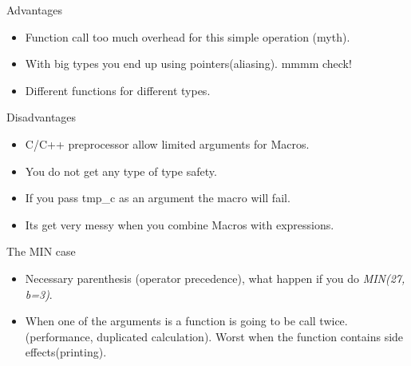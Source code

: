 \begin{frame}{Advantages}
    \begin{itemize}\addtolength{\itemsep}{1\baselineskip}
        \item Function call too much overhead for this simple operation (myth).

        \item With big types you end up using pointers(aliasing).
            {\color{red}mmmm check!}

        \item Different functions for different types.
    \end{itemize}
\end{frame}

\begin{frame}{Disadvantages}
    \begin{itemize}\addtolength{\itemsep}{1\baselineskip}
        \item C/C++ preprocessor allow limited arguments for Macros.

        \item You do not get any type of type safety.

        \item If you pass tmp\_c as an argument the macro will fail.

        \item Its get very messy when you combine Macros with expressions.
    \end{itemize}
\end{frame}


\begin{frame}{The MIN case}
    \begin{itemize}\addtolength{\itemsep}{2\baselineskip}
        \item Necessary parenthesis (operator precedence), what happen if you 
            do \emph{MIN(27, b=3)}.

        \item When one of the arguments is a function is going to be call twice. 
            (performance, duplicated calculation). Worst when the function
            contains side effects(printing).
    \end{itemize}
\end{frame}





